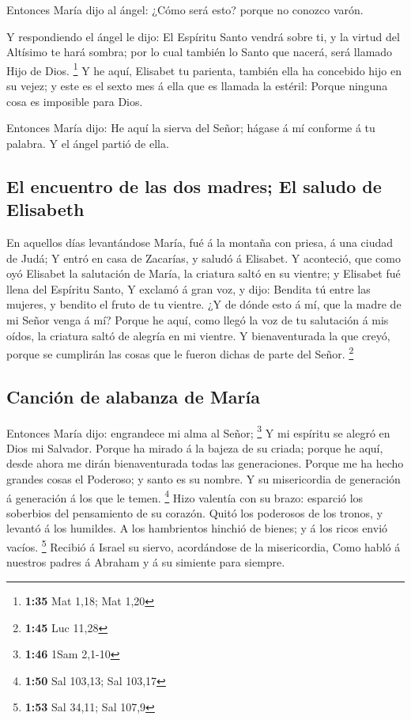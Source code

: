  Entonces María dijo al ángel: ¿Cómo será esto? porque no
conozco varón.

 Y respondiendo el ángel le dijo: El Espíritu Santo
vendrá sobre ti, y la virtud del Altísimo te hará sombra; por lo cual
también lo Santo que nacerá, será llamado Hijo de Dios. \footnote{\textbf{1:35}
  Mat 1,18; Mat 1,20}  Y he aquí, Elisabet tu parienta,
también ella ha concebido hijo en su vejez; y este es el sexto mes á
ella que es llamada la estéril:  Porque ninguna cosa es
imposible para Dios.

 Entonces María dijo: He aquí la sierva del Señor; hágase
á mí conforme á tu palabra. Y el ángel partió de ella.

\hypertarget{el-encuentro-de-las-dos-madres-el-saludo-de-elisabeth}{%
\subsection{El encuentro de las dos madres; El saludo de
Elisabeth}\label{el-encuentro-de-las-dos-madres-el-saludo-de-elisabeth}}

 En aquellos días levantándose María, fué á la montaña
con priesa, á una ciudad de Judá;  Y entró en casa de
Zacarías, y saludó á Elisabet.  Y aconteció, que como oyó
Elisabet la salutación de María, la criatura saltó en su vientre; y
Elisabet fué llena del Espíritu Santo,  Y exclamó á gran
voz, y dijo: Bendita tú entre las mujeres, y bendito el fruto de tu
vientre.  ¿Y de dónde esto á mí, que la madre de mi Señor
venga á mí?  Porque he aquí, como llegó la voz de tu
salutación á mis oídos, la criatura saltó de alegría en mi vientre.
 Y bienaventurada la que creyó, porque se cumplirán las
cosas que le fueron dichas de parte del Señor. \footnote{\textbf{1:45}
  Luc 11,28}

\hypertarget{canciuxf3n-de-alabanza-de-maruxeda}{%
\subsection{Canción de alabanza de
María}\label{canciuxf3n-de-alabanza-de-maruxeda}}

 Entonces María dijo: engrandece mi alma al Señor;
\footnote{\textbf{1:46} 1Sam 2,1-10}  Y mi espíritu se
alegró en Dios mi Salvador.  Porque ha mirado á la bajeza
de su criada; porque he aquí, desde ahora me dirán bienaventurada todas
las generaciones.  Porque me ha hecho grandes cosas el
Poderoso; y santo es su nombre.  Y su misericordia de
generación á generación á los que le temen. \footnote{\textbf{1:50} Sal
  103,13; Sal 103,17}  Hizo valentía con su brazo:
esparció los soberbios del pensamiento de su corazón. 
Quitó los poderosos de los tronos, y levantó á los humildes.
 A los hambrientos hinchió de bienes; y á los ricos envió
vacíos. \footnote{\textbf{1:53} Sal 34,11; Sal 107,9} 
Recibió á Israel su siervo, acordándose de la misericordia,
 Como habló á nuestros padres á Abraham y á su simiente
para siempre.

